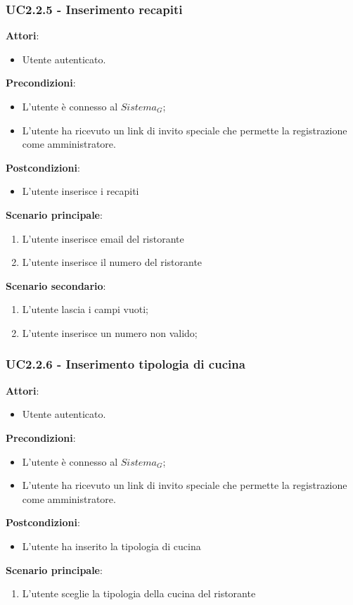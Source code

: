 \subsubsection{UC2.2.5 - Inserimento recapiti}
\textbf{Attori}:
\begin{itemize}
    \item Utente autenticato.
\end{itemize}
\textbf{Precondizioni}:
\begin{itemize}
    \item L'utente è connesso al $\textit{Sistema}_G$;
    \item L'utente ha ricevuto un link di invito speciale che permette la registrazione come amministratore.
\end{itemize}
\textbf{Postcondizioni}:
\begin{itemize}
    \item L'utente inserisce i recapiti
\end{itemize}
\textbf{Scenario principale}:
\begin{enumerate}
    \item L'utente inserisce email del ristorante
    \item L'utente inserisce il numero del ristorante
\end{enumerate}
\textbf{Scenario secondario}:
\begin{enumerate}
    \item L'utente lascia i campi vuoti;
    \item L'utente inserisce un numero non valido;
\end{enumerate}
\subsubsection{UC2.2.6 - Inserimento tipologia di cucina}
\textbf{Attori}:
\begin{itemize}
    \item Utente autenticato.
\end{itemize}
\textbf{Precondizioni}:
\begin{itemize}
    \item L'utente è connesso al $\textit{Sistema}_G$;
    \item L'utente ha ricevuto un link di invito speciale che permette la registrazione come amministratore.
\end{itemize}
\textbf{Postcondizioni}:
\begin{itemize}
    \item L'utente ha inserito la tipologia di cucina
\end{itemize}
\textbf{Scenario principale}:
\begin{enumerate}
    \item L'utente sceglie la tipologia della cucina del ristorante
\end{enumerate}
\newpage